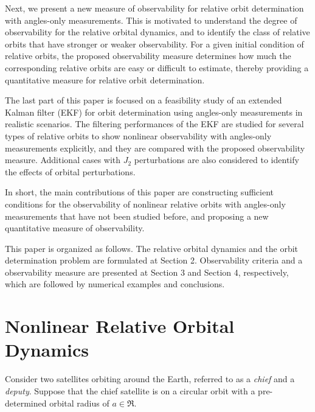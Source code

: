 Next, we present a new measure of observability for relative orbit determination with angles-only measurements. This is motivated to understand the degree of observability for the relative orbital dynamics, and to identify the class of relative orbits that have stronger or weaker observability. For a given initial condition of relative orbits, the proposed observability measure determines how much the corresponding relative orbits are easy or difficult to estimate, thereby providing a quantitative measure for relative orbit determination.

The last part of this paper is focused on a feasibility study of an extended Kalman filter (EKF) for orbit determination using angles-only measurements in realistic scenarios. The filtering performances of the EKF are studied for several types of relative orbits to show nonlinear observability with angles-only measurements explicitly, and they are compared with the proposed observability measure. Additional cases with $J_2$ perturbations are also considered to identify the effects of orbital perturbations. 

In short, the main contributions of this paper are constructing sufficient conditions for the observability of nonlinear relative orbits with angles-only measurements that have not been studied before, and proposing a new quantitative measure of observability. 

This paper is organized as follows. The relative orbital dynamics and the orbit determination problem are formulated at Section 2. Observability criteria and a observability measure are presented at Section 3 and Section 4, respectively, which are followed by numerical examples and conclusions.


\section{Nonlinear Relative Orbital Dynamics}\label{sec:ND}

Consider two satellites orbiting around the Earth, referred to as a \textit{chief} and a \textit{deputy}. Suppose that the chief satellite is on a circular orbit with a pre-determined orbital radius of $a\in\Re$.

